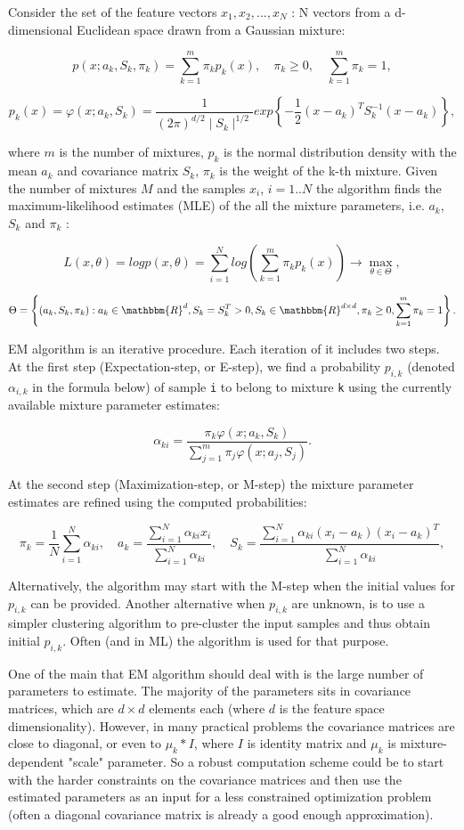 Consider the set of the feature vectors $x_1, x_2,...,x_{N}$ : N vectors from a d-dimensional Euclidean space drawn from a Gaussian mixture:

\[
p(x;a_k,S_k,\pi_k) = \sum_{k=1}^{m}\pi_kp_k(x), \quad \pi_k \geq 0, \quad \sum_{k=1}^{m}\pi_k=1,
\]

\[
p_k(x)=\varphi(x;a_k,S_k)=\frac{1}{(2\pi)^{d/2}\mid{S_k}\mid^{1/2}}exp\left\{-\frac{1}{2}(x-a_k)^TS_k^{-1}(x-a_k)\right\},
\]

where $m$ is the number of mixtures, $p_k$ is the normal distribution
density with the mean $a_k$ and covariance matrix $S_k$, $\pi_k$
is the weight of the k-th mixture. Given the number of mixtures
$M$ and the samples $x_i$, $i=1..N$ the algorithm finds the
maximum-likelihood estimates (MLE) of the all the mixture parameters,
i.e. $a_k$, $S_k$ and $\pi_k$ :

\[
L(x,\theta)=logp(x,\theta)=\sum_{i=1}^{N}log\left(\sum_{k=1}^{m}\pi_kp_k(x)\right)\to\max_{\theta\in\Theta},
\]

\[
\Theta=\left\{(a_k,S_k,\pi_k): a_k \in \mathbbm{R} ^d,S_k=S_k^T>0,S_k \in \mathbbm{R} ^{d \times d},\pi_k\geq 0,\sum_{k=1}^{m}\pi_k=1\right\}.
\]

EM algorithm is an iterative procedure. Each iteration of it includes
two steps. At the first step (Expectation-step, or E-step), we find a
probability $p_{i,k}$ (denoted $\alpha_{i,k}$ in the formula below) of
sample \texttt{i} to belong to mixture \texttt{k} using the currently
available mixture parameter estimates:

\[
\alpha_{ki} = \frac{\pi_k\varphi(x;a_k,S_k)}{\sum\limits_{j=1}^{m}\pi_j\varphi(x;a_j,S_j)}.
\]

At the second step (Maximization-step, or M-step) the mixture parameter estimates are refined using the computed probabilities:

\[
\pi_k=\frac{1}{N}\sum_{i=1}^{N}\alpha_{ki}, \quad a_k=\frac{\sum\limits_{i=1}^{N}\alpha_{ki}x_i}{\sum\limits_{i=1}^{N}\alpha_{ki}}, \quad S_k=\frac{\sum\limits_{i=1}^{N}\alpha_{ki}(x_i-a_k)(x_i-a_k)^T}{\sum\limits_{i=1}^{N}\alpha_{ki}},
\]

Alternatively, the algorithm may start with the M-step when the initial values for $p_{i,k}$ can be provided. Another alternative when $p_{i,k}$ are unknown, is to use a simpler clustering algorithm to pre-cluster the input samples and thus obtain initial $p_{i,k}$. Often (and in ML) the  algorithm is used for that purpose.

One of the main that EM algorithm should deal with is the large number
of parameters to estimate. The majority of the parameters sits in
covariance matrices, which are $d \times d$ elements each
(where $d$ is the feature space dimensionality). However, in
many practical problems the covariance matrices are close to diagonal,
or even to $\mu_k*I$, where $I$ is identity matrix and
$\mu_k$ is mixture-dependent "scale" parameter. So a robust computation
scheme could be to start with the harder constraints on the covariance
matrices and then use the estimated parameters as an input for a less
constrained optimization problem (often a diagonal covariance matrix is
already a good enough approximation).

